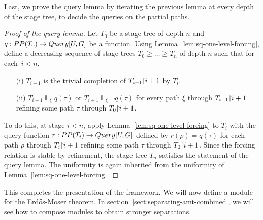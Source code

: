 Last, we prove the query lemma by iterating the previous lemma at every depth of the stage
tree, to decide the queries on the partial paths.

\begin{proof}[Proof of the query lemma]
Let $T_0$ be a stage tree of depth $n$ and $q : PP(T_0) \to \mathop{Query}[U,G]$ be a function.
Using Lemma~\ref{lem:sq-one-level-forcing},
define a decreasing sequence of stage trees $T_0 \geq \dots \geq T_n$  of depth $n$
such that for each~$i < n$, 
\begin{itemize}
	\item[(i)] $T_{i+1}$ is the trivial completion of $T_{i+1} {\upharpoonright} i+1$ by $T_i$.
	\item[(ii)] $T_{i+1} \Vdash_\xi q(\tau)$ or $T_{i+1} \Vdash_\xi \neg q(\tau)$ for every
	path $\xi$ through $T_{i+1} {\upharpoonright} i+1$ refining some path $\tau$ through $T_0 {\upharpoonright} i+1$.
\end{itemize}
To do this, at stage $i < n$, apply Lemma~\ref{lem:sq-one-level-forcing} to $T_i$ with the query function $r : PP(T_i) \to \mathop{Query}[U,G]$
defined by $r(\rho) = q(\tau)$ for each path $\rho$ through $T_i {\upharpoonright} i+1$ refining some path $\tau$ through $T_0 {\upharpoonright} i+1$.
Since the forcing relation is stable by refinement, the stage tree $T_n$ satisfies the statement of the query lemma.
The uniformity is again inherited from the uniformity of Lemma~\ref{lem:sq-one-level-forcing}.
\end{proof}

This completes the presentation of the framework. We will now define a module for the Erd\H{o}s-Moser
theorem. In section~\ref{sect:separating-amt-combined}, we will see how to compose modules to obtain stronger separations.


